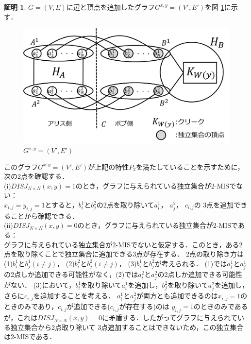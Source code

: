 \documentclass[12pt]{thesis}
\theoremstyle{definition}
\newtheorem*{prf*}{証明}
\begin{document}
\begin{prf*}
$G = (V, E)$に辺と頂点を追加したグラフ$G^{x, y} = (V', E')$を図 \ref{2_G(x,y)}に示す．

\begin{figure}[ht]
\begin{center}
\includegraphics[width=120mm]{2_Gxy.png}
\end{center}
\caption{$G^{x, y} = (V', E')$}
\label{2_G(x,y)}
\end{figure}

このグラフ$G^{x, y} = (V', E')$が上記の特性$P_{2}$を満たしていることを示すために，次の2点を確認する． \\
(i)$DISJ_{N \times N} (x, y) = 1$のとき，グラフに与えられている独立集合が2-MISでない： \\
$x_{i, j} = y_{i, j} =1$とすると，$b_{i}^{1}$と$b_{j}^{2}$の2点を取り除いて$a_{i}^{1}$， $a_{j}^{2}$， $c_{i, j}$の
3点を追加できることから確認できる． \\
(ii)$DISJ_{N \times N} (x, y) = 0$のとき，グラフに与えられている独立集合が2-MISである： \\ 
グラフに与えられている独立集合が2-MISでないと仮定する．このとき，ある2点を取り除くことで独立集合に追加できる3点が存在する．
2点の取り除き方は(1)$b_{i}^{1}$と$b_{j}^{1}(i \neq j)$， (2)$b_{i}^{2}$と$b_{j}^{2}(i \neq j)$， (3)$b_{i}^{1}$と$b_{j}^{2}$が考えられる．
(1)では$a_{i}^{1}$と$a_{j}^{1}$の2点しか追加できる可能性がなく，(2)では$a_{i}^{2}$と$a_{j}^{2}$の2点しか追加できる可能性がない．
(3)において，$b_{i}^{1}$を取り除いて$a_{i}^{1}$を追加し，$b_{j}^{2}$を取り除いて$a_{j}^{2}$を追加し，さらに$c_{i, j}$を追加することを考える．
$a_{i}^{1}$と$a_{j}^{2}$が両方とも追加できるのは$x_{i, j} = 1$のときのみであり，$c_{i, j}$が追加できる($c_{i, j}$が存在する)のは
$y_{i, j} = 1$のときのみであるが，これは$DISJ_{N \times N} (x, y) = 0$に矛盾する．したがってグラフに与えられている独立集合から2点取り除いて
3点追加することはできないため，この独立集合は2-MISである．


\end{prf*}
\end{document}
